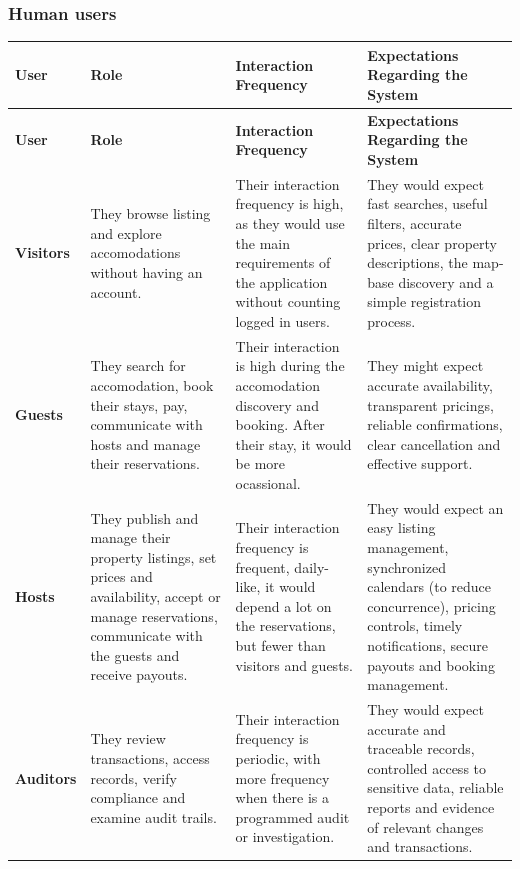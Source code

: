 \subsubsection{Human users}
\begin{longtable}{|L{0.15\textwidth}|L{0.27\textwidth}|L{0.25\textwidth}|L{0.27\textwidth}|}
    \hline
    \textbf{User} &
    \textbf{Role} &
    \textbf{Interaction Frequency} &
    \textbf{Expectations Regarding the System} \\
    \hline
    \endfirsthead

    \hline
    \textbf{User} &
    \textbf{Role} &
    \textbf{Interaction Frequency} &
    \textbf{Expectations Regarding the System} \\
    \hline
    \endhead

    \textbf{Visitors} &
    They browse listing and explore accomodations without having an account. &
    Their interaction frequency is high, as they would use the main requirements of the application without counting 
    logged in users. &
    They would expect fast searches, useful filters, accurate prices, clear property descriptions, the map-base 
    discovery and a simple registration process. \\
    \hline

    \textbf{Guests} &
    They search for accomodation, book their stays, pay, communicate with hosts and manage their reservations. &
    Their interaction is high during the accomodation discovery and booking. After their stay, it would be more 
    ocassional. &
    They might expect accurate availability, transparent pricings, reliable confirmations, clear cancellation and 
    effective support. \\
    \hline

    \textbf{Hosts} &
    They publish and manage their property listings, set prices and availability, accept or manage reservations, 
    communicate with the guests and receive payouts. &
    Their interaction frequency is frequent, daily-like, it would depend a lot on the reservations, but fewer than 
    visitors and guests. &
    They would expect an easy listing management, synchronized calendars (to reduce concurrence), pricing controls, 
    timely notifications, secure payouts and booking management. \\
    \hline

    \textbf{Auditors} &
    They review transactions, access records, verify compliance and examine audit trails. &
    Their interaction frequency is periodic, with more frequency when there is a programmed audit or investigation. &
    They would expect accurate and traceable records, controlled access to sensitive data, reliable reports and 
    evidence of relevant changes and transactions. \\
    \hline


\end{longtable}
